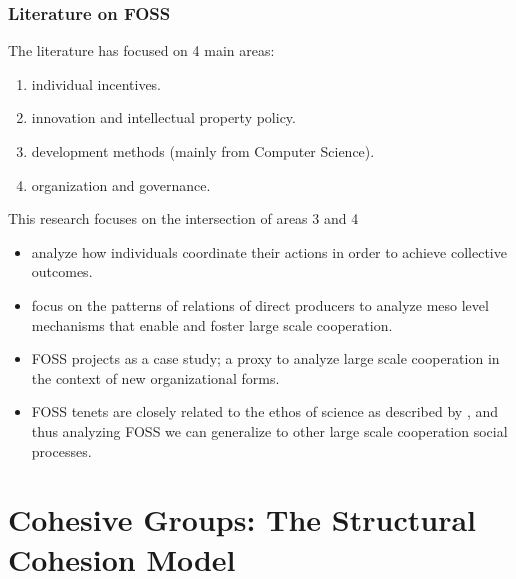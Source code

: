 \documentclass[ignorenonframetext,red,8pt,notes=hide]{beamer}
\begin{document}
\begin{frame}
\frametitle{Literature on FOSS}

\begin{block}{The literature has focused on 4 main areas:}
\begin{enumerate}
\item individual incentives.
\item innovation and intellectual property policy.
\item development methods (mainly from Computer Science).
\item organization and governance.
\end{enumerate}
\end{block}

\pause

\begin{block}{This research focuses on the intersection of areas 3 and 4}
\begin{itemize}
\item analyze how individuals coordinate their actions in order to achieve collective outcomes.
\item focus on the patterns of relations of direct producers to analyze meso level mechanisms that enable and foster large scale cooperation.
\item FOSS projects as a case study; a proxy to analyze large scale cooperation in the context of new organizational forms.
\item FOSS tenets are closely related to the ethos of science as described by \citet{merton:1942}, and thus analyzing FOSS we can generalize to other large scale cooperation social processes.
\end{itemize}
\end{block}

\end{frame}


\section{Cohesive Groups: The Structural Cohesion Model}
\end{document}
